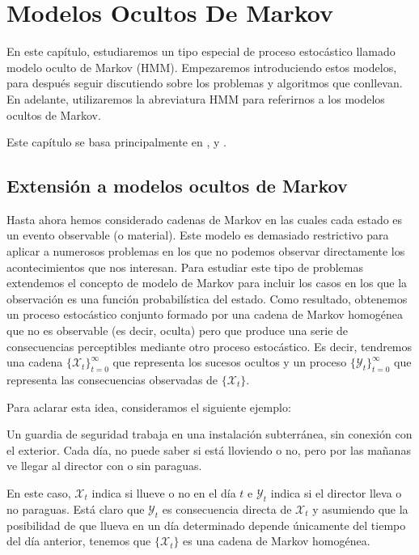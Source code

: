 \chapter{Modelos Ocultos De Markov}

En este capítulo, estudiaremos un tipo especial de proceso estocástico llamado modelo oculto de Markov (HMM). Empezaremos introduciendo estos modelos, para después seguir discutiendo sobre los problemas y algoritmos que conllevan. En adelante, utilizaremos la abreviatura HMM para referirnos a los modelos ocultos de Markov. 

Este capítulo se basa principalmente en \cite{Rabiner}, \cite{Sevilla_2019} y \cite{Russell}.

\section{Extensión a modelos ocultos de Markov}
Hasta ahora hemos considerado cadenas de Markov en las cuales cada estado es un evento observable (o material). Este modelo es demasiado restrictivo para aplicar a numerosos problemas en los que no podemos observar directamente los acontecimientos que nos interesan. Para estudiar este tipo de problemas extendemos el concepto de modelo de Markov para incluir los casos en los que la observación es una función probabilística del estado. Como resultado, obtenemos un proceso estocástico conjunto formado por una cadena de Markov homogénea que no es observable (es decir, oculta) pero que produce una serie de consecuencias perceptibles mediante otro proceso estocástico. Es decir, tendremos una cadena $\{\mathcal{X}_t\}_{t=0}^{\infty}$ que representa los sucesos ocultos y un proceso $\{\mathcal{Y}_t\}_{t=0}^{\infty}$ que representa las consecuencias observadas de $\{\mathcal{X}_t\}$. 

Para aclarar esta idea, consideramos el siguiente ejemplo:

\begin{exampleth}\label{ejemplo_paraguas}
Un guardia de seguridad trabaja en una instalación subterránea, sin conexión con el exterior. Cada día, no puede saber si está lloviendo o no, pero por las mañanas ve llegar al director con o sin paraguas.

En este caso, $\mathcal{X}_t$ indica si llueve o no en el día $t$ e $\mathcal{Y}_t$ indica si el director lleva o no paraguas. Está claro que $\mathcal{Y}_t$ es consecuencia directa de $\mathcal{X}_t$ y asumiendo que la posibilidad de que llueva en un día determinado depende únicamente del tiempo del día anterior, tenemos que $\{\mathcal{X}_t\}$ es una cadena de Markov homogénea.

\end{exampleth}

